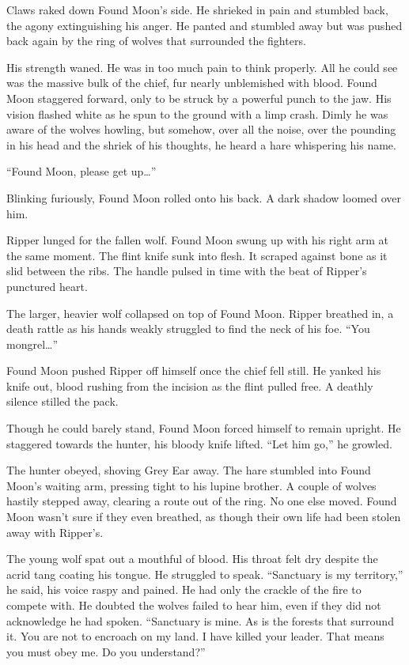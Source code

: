Claws raked down Found Moon's side. He shrieked in pain and stumbled back, the agony extinguishing his anger. He panted and stumbled away but was pushed back again by the ring of wolves that surrounded the fighters.

His strength waned. He was in too much pain to think properly. All he could see was the massive bulk of the chief, fur nearly unblemished with blood. Found Moon staggered forward, only to be struck by a powerful punch to the jaw. His vision flashed white as he spun to the ground with a limp crash. Dimly he was aware of the wolves howling, but somehow, over all the noise, over the pounding in his head and the shriek of his thoughts, he heard a hare whispering his name.

``Found Moon, please get up\ldots''

Blinking furiously, Found Moon rolled onto his back. A dark shadow loomed over him.

Ripper lunged for the fallen wolf. Found Moon swung up with his right arm at the same moment. The flint knife sunk into flesh. It scraped against bone as it slid between the ribs. The handle pulsed in time with the beat of Ripper's punctured heart.

The larger, heavier wolf collapsed on top of Found Moon. Ripper breathed in, a death rattle as his hands weakly struggled to find the neck of his foe. ``You mongrel\ldots''

Found Moon pushed Ripper off himself once the chief fell still. He yanked his knife out, blood rushing from the incision as the flint pulled free. A deathly silence stilled the pack.

Though he could barely stand, Found Moon forced himself to remain upright. He staggered towards the hunter, his bloody knife lifted. ``Let him go,'' he growled.

The hunter obeyed, shoving Grey Ear away. The hare stumbled into Found Moon's waiting arm, pressing tight to his lupine brother. A couple of wolves hastily stepped away, clearing a route out of the ring. No one else moved. Found Moon wasn't sure if they even breathed, as though their own life had been stolen away with Ripper's.

The young wolf spat out a mouthful of blood. His throat felt dry despite the acrid tang coating his tongue. He struggled to speak. ``Sanctuary is my territory,'' he said, his voice raspy and pained. He had only the crackle of the fire to compete with. He doubted the wolves failed to hear him, even if they did not acknowledge he had spoken. ``Sanctuary is mine. As is the forests that surround it. You are not to encroach on my land. I have killed your leader. That means you must obey me. Do you understand?''

